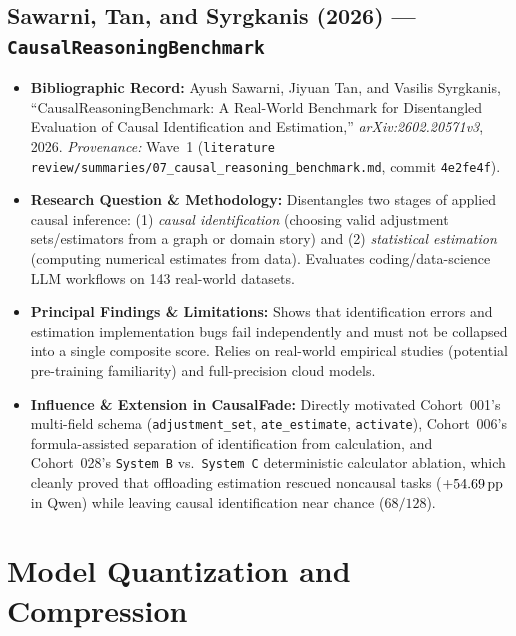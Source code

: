 \subsection{Sawarni, Tan, and Syrgkanis (2026) --- \texttt{CausalReasoningBenchmark} \citep{sawarni2026crb}}
\begin{itemize}
  \item \textbf{Bibliographic Record:} Ayush Sawarni, Jiyuan Tan, and Vasilis Syrgkanis, ``CausalReasoningBenchmark: A Real-World Benchmark for Disentangled Evaluation of Causal Identification and Estimation,'' \emph{arXiv:2602.20571v3}, 2026. \emph{Provenance:} Wave~1 (\texttt{literature review/summaries/07\_causal\_reasoning\_benchmark.md}, commit \texttt{4e2fe4f}).
  \item \textbf{Research Question \& Methodology:} Disentangles two stages of applied causal inference: (1) \emph{causal identification} (choosing valid adjustment sets/estimators from a graph or domain story) and (2) \emph{statistical estimation} (computing numerical estimates from data). Evaluates coding/data-science LLM workflows on 143 real-world datasets.
  \item \textbf{Principal Findings \& Limitations:} Shows that identification errors and estimation implementation bugs fail independently and must not be collapsed into a single composite score. Relies on real-world empirical studies (potential pre-training familiarity) and full-precision cloud models.
  \item \textbf{Influence \& Extension in CausalFade:} Directly motivated Cohort~001's multi-field schema (\texttt{adjustment\_set}, \texttt{ate\_estimate}, \texttt{activate}), Cohort~006's formula-assisted separation of identification from calculation, and Cohort~028's \texttt{System B} vs.\ \texttt{System C} deterministic calculator ablation, which cleanly proved that offloading estimation rescued noncausal tasks ($+54.69\,\mathrm{pp}$ in Qwen) while leaving causal identification near chance ($68/128$).
\end{itemize}

\section{Model Quantization and Compression}

